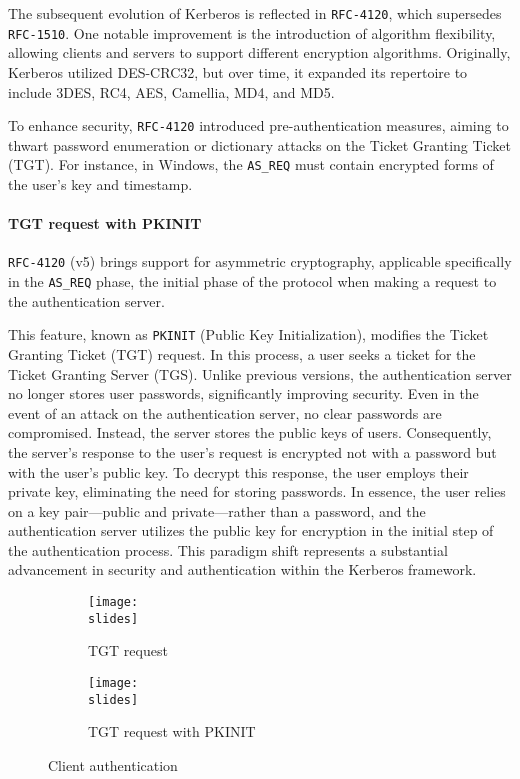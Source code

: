 The subsequent evolution of Kerberos is reflected in \texttt{RFC-4120}, which supersedes \texttt{RFC-1510}. One notable improvement is the introduction of algorithm flexibility, allowing clients and servers to support different encryption algorithms. Originally, Kerberos utilized DES-CRC32, but over time, it expanded its repertoire to include 3DES, RC4, AES, Camellia, MD4, and MD5.

To enhance security, \texttt{RFC-4120} introduced pre-authentication measures, aiming to thwart password enumeration or dictionary attacks on the Ticket Granting Ticket (TGT). For instance, in Windows, the \texttt{AS\_REQ} must contain encrypted forms of the user's key and timestamp.

\paragraph{TGT request with PKINIT}
\texttt{RFC-4120} (v5) brings support for asymmetric cryptography, applicable specifically in the \texttt{AS\_REQ} phase, the initial phase of the protocol when making a request to the authentication server.


This feature, known as \texttt{PKINIT} (Public Key Initialization), modifies the Ticket Granting Ticket (TGT) request. In this process, a user seeks a ticket for the Ticket Granting Server (TGS). Unlike previous versions, the authentication server no longer stores user passwords, significantly improving security. Even in the event of an attack on the authentication server, no clear passwords are compromised. Instead, the server stores the public keys of users. Consequently, the server's response to the user's request is encrypted not with a password but with the user's public key. To decrypt this response, the user employs their private key, eliminating the need for storing passwords. In essence, the user relies on a key pair—public and private—rather than a password, and the authentication server utilizes the public key for encryption in the initial step of the authentication process. This paradigm shift represents a substantial advancement in security and authentication within the Kerberos framework.


\begin{figure}[H]
  \centering
  \begin{subfigure}{0.45\textwidth}
    \texttt{[image: \\slides]}
    \caption{TGT request}
  \end{subfigure}
  \hfill
  \begin{subfigure}{0.45\textwidth}
    \texttt{[image: \\slides]}
    \caption{TGT request with PKINIT}
  \end{subfigure}
  \caption{Client authentication}
\end{figure}



